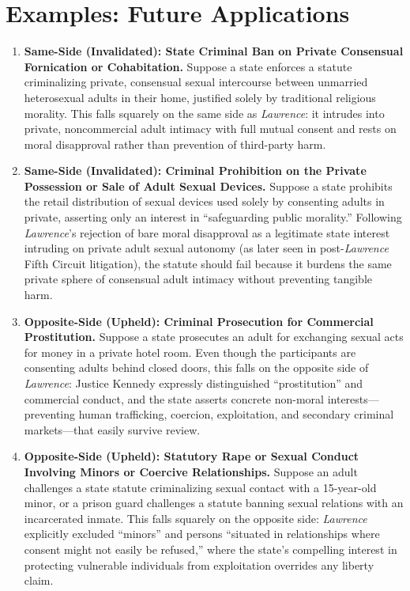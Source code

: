 \documentclass[12pt]{article}
\begin{document}
\section{Examples: Future Applications}
\begin{enumerate}
\item \textbf{Same-Side (Invalidated): State Criminal Ban on Private Consensual Fornication or Cohabitation.} Suppose a state enforces a statute criminalizing private, consensual sexual intercourse between unmarried heterosexual adults in their home, justified solely by traditional religious morality. This falls squarely on the same side as \textit{Lawrence}: it intrudes into private, noncommercial adult intimacy with full mutual consent and rests on moral disapproval rather than prevention of third-party harm.
\item \textbf{Same-Side (Invalidated): Criminal Prohibition on the Private Possession or Sale of Adult Sexual Devices.} Suppose a state prohibits the retail distribution of sexual devices used solely by consenting adults in private, asserting only an interest in ``safeguarding public morality.'' Following \textit{Lawrence}'s rejection of bare moral disapproval as a legitimate state interest intruding on private adult sexual autonomy (as later seen in post-\textit{Lawrence} Fifth Circuit litigation), the statute should fail because it burdens the same private sphere of consensual adult intimacy without preventing tangible harm.
\item \textbf{Opposite-Side (Upheld): Criminal Prosecution for Commercial Prostitution.} Suppose a state prosecutes an adult for exchanging sexual acts for money in a private hotel room. Even though the participants are consenting adults behind closed doors, this falls on the opposite side of \textit{Lawrence}: Justice Kennedy expressly distinguished ``prostitution'' and commercial conduct, and the state asserts concrete non-moral interests---preventing human trafficking, coercion, exploitation, and secondary criminal markets---that easily survive review.
\item \textbf{Opposite-Side (Upheld): Statutory Rape or Sexual Conduct Involving Minors or Coercive Relationships.} Suppose an adult challenges a state statute criminalizing sexual contact with a 15-year-old minor, or a prison guard challenges a statute banning sexual relations with an incarcerated inmate. This falls squarely on the opposite side: \textit{Lawrence} explicitly excluded ``minors'' and persons ``situated in relationships where consent might not easily be refused,'' where the state's compelling interest in protecting vulnerable individuals from exploitation overrides any liberty claim.

\end{enumerate}
\end{document}
